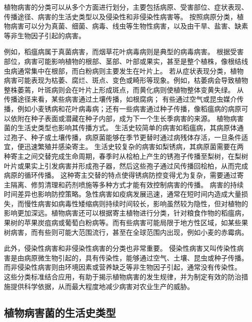 \documentclass[AutoFakeBold]{LZUThesis-PgD&PhD}
\begin{document}
植物病害的分类可以从多个方面进行划分，主要包括病原、受害部位、症状表现、传播途径、病害的生活史类型以及侵染性和非侵染性病害等。
按照病原分类，植物病害可以分为真菌、细菌、病毒、线虫等生物性病害，以及由干旱、盐害、缺素等非生物因子引起的病害。

例如，稻瘟病属于真菌病害，而烟草花叶病毒病则是典型的病毒病害。
根据受害部位，病害可能影响植物的根部、茎部、叶部或果实，甚至是整个植株，像根结线虫病通常集中在根部，而白粉病则主要发生在叶片上。
若从症状表现分类，植物病害可能表现为枯萎、腐烂、斑点、变色或畸形等现象。例如，枯萎病会导致植物整株萎蔫，叶斑病则会在叶片上形成斑点，而黄化病则使植物整体变黄失绿。
从传播途径来看，某些病害通过土壤传播，如根腐病；
有些通过空气或昆虫媒介传播，例如小麦锈病和花叶病毒病；还有一些病害通过种子传播，像稻瘟病的病原可以依附在种子表面或潜藏在种子内部，成为下一个生长季病害的来源。
植物病害菌的生活史类型也影响其传播方式。
生活史较简单的病害如稻瘟病，其病原体通过孢子、种子或土壤传播，病原菌能够在季节更替时通过病残体存活，一旦条件适宜，便迅速繁殖并感染寄主。
生活史较复杂的病害如梨锈病，其病原菌需要在两种寄主之间交替完成生命周期，春季时从桧柏上产生的锈孢子传播至梨树，在梨树叶片或果实上引发病害并形成孢子器，然后这些孢子通过风传播回桧柏，从而完成病原的循环传播。
这种寄主交替的特点使得锈病防控变得尤为复杂，需要通过寄主隔离、修剪清理和药剂喷施等多种方式才能有效控制病害的传播。
病害的持续时间差异也影响防控策略。急性病害如疫病发展迅速，通常在短时间内造成大量损失，而慢性病害如病毒性矮缩病则持续时间较长，影响虽然较为隐性，但对植物的影响更加深远。植物病害还可以根据寄主植物进行分类，针对粮食作物的稻瘟病，果树的苹果炭疽病或葡萄白粉病等。而有些病害可能局限于地方性区域，如某些果树病害，而有些则可能大范围流行，甚至在全球范围内出现，例如小麦的赤霉病。


此外，侵染性病害和非侵染性病害的分类也非常重要。
侵染性病害又叫传染性病害是由病原微生物引起的，具有传染性，能够通过空气、土壤、昆虫或种子传播。
而非侵染性病害则由环境因素或营养缺乏等非生物因子引起，通常没有传染性。
这些分类标准结合应用，有助于揭示植物病害的发生规律，并为制定有效的防治措施提供科学依据，从而最大程度地减少病害对农业生产的威胁。

\subsection{植物病害菌的生活史类型}
\end{document}
